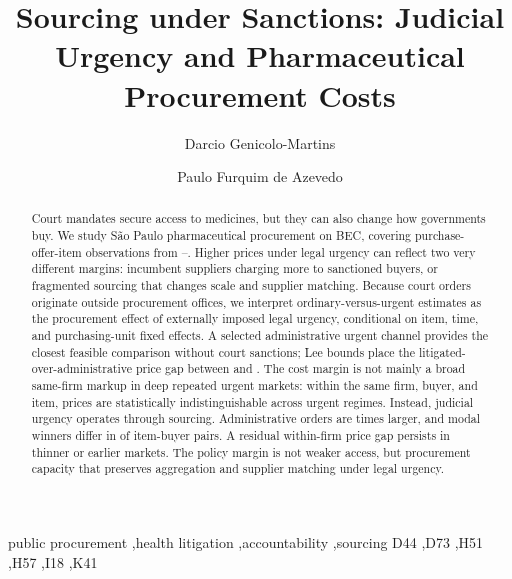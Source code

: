 \documentclass[review,11pt,authoryear]{elsarticle}
\begin{document}
\begin{frontmatter}

\title{Sourcing under Sanctions: Judicial Urgency and Pharmaceutical Procurement Costs%
}

\author[INSPER]{Darcio Genicolo-Martins}
\author[INSPER]{Paulo Furquim de Azevedo}
\address[INSPER]{Insper Institute of Education and Research,
  Rua Quat\'a 300, S\~ao Paulo, SP 04546-042, Brazil}

\begin{abstract}
Court mandates secure access to medicines, but they can also change
how governments buy. We study S\~ao Paulo pharmaceutical procurement
on BEC, covering \BPnPOIfull{} purchase-offer-item observations from
\BPsampleStartYear--\BPsampleEndYear. Higher prices under legal
urgency can reflect two very different margins: incumbent suppliers
charging more to sanctioned buyers, or fragmented sourcing that
changes scale and supplier matching. Because court orders originate
outside procurement offices, we interpret ordinary-versus-urgent
estimates as the procurement effect of externally imposed legal
urgency, conditional on item, time, and purchasing-unit fixed effects.
A selected administrative urgent channel provides the closest feasible
comparison without court sanctions; Lee bounds place the
litigated-over-administrative price gap between \BPutgBoundLow{} and
\BPutgBoundHigh{}. The cost margin is not mainly a broad same-firm
markup in deep repeated urgent markets: within the same firm, buyer,
and item, prices are statistically indistinguishable across urgent
regimes. Instead, judicial urgency operates through sourcing.
Administrative orders are \BPutgQtyAdminFoldPref{} times larger, and
modal winners differ in \BPwinnerSwitchDiffModalPct{} of item-buyer
pairs. A residual within-firm price gap persists in thinner or earlier markets.
The policy margin is not weaker access, but procurement capacity that
preserves aggregation and supplier matching under legal urgency.
\end{abstract}

\begin{keyword}
public procurement \sep health litigation \sep accountability \sep sourcing
\JEL D44 \sep D73 \sep H51 \sep H57 \sep I18 \sep K41
\end{keyword}

\end{frontmatter}








\begingroup
\singlespacing


\endgroup
\end{document}
